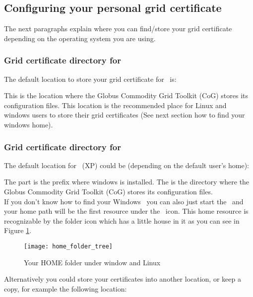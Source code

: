 \subsection{Configuring your personal grid certificate}
\label{sec:user_configuration}

The next paragraphs explain where you can find/store your grid certificate
depending on the operating system you are using. 

\subsubsection{Grid certificate directory for \Linux}

 The default location to store your grid certificate for \Linux\ is:
 
 	\tab {}  

 This is the location where the Globus Commodity Grid Toolkit (CoG) stores its
 configuration files. This location is the recommended place for Linux and
 windows users to store their grid certificates (See next section how to find
 your windows home).
 
\subsubsection{Grid certificate directory for \windows}
 
 The default location for \windows\ (XP) could be (depending on the default
 user's home): 
 
	 \tab {}

 The  part is the prefix where windows is installed. 
 The  is the directory where the Globus Commodity Grid
 Toolkit (CoG) stores its  configuration files. \\
 If you don't know how to find your Windows \HOME\ you can also just start the
 \vbrowser\ and your home path will be the first resource under the \LocalSys\ icon. 
 This home resource is recognizable by the folder icon
 which has a little house in it as you can see in Figure \ref{fig:home_folder_in_tree}.
 
  \begin{figure}[htbp]
  \centerline{\texttt{[image: home\_folder\_tree]}}
  \caption{Your HOME folder under window and Linux}
  \label{fig:home_folder_in_tree}
 \end{figure}
 
 Alternatively you could store your certificates into
 another location, or keep a copy, for example the following location:
 
